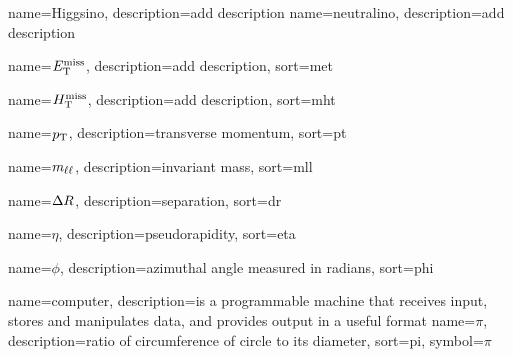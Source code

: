 {
  name=Higgsino,
  description={add description}
}
{
  name=neutralino,
  description={add description}
}

{
  name={\ensuremath{\MET}},
  description={add description},
  sort={met}
}


{
  name={\ensuremath{\mht}},
  description={add description},
  sort={mht}
}
 
{
  name={\ensuremath{\pt}},
  description={transverse momentum},
  sort={pt}
}

{
  name={\ensuremath{\mll}},
  description={invariant mass},
  sort={mll}
}

{
  name={\ensuremath{\DR}},
  description={separation},
  sort={dr}
}

{
  name={\ensuremath{\eta}},
  description={pseudorapidity},
  sort={eta}
}

{
  name={\ensuremath{\phi}},
  description={azimuthal angle measured in radians},
  sort={phi}
}

{
  name=computer,
  description={is a programmable machine that receives input,
               stores and manipulates data, and provides
               output in a useful format}
}
{
name={\ensuremath{\pi}},
description={ratio of circumference of circle to its diameter},
sort=pi,
symbol={\ensuremath{\pi}}
 }